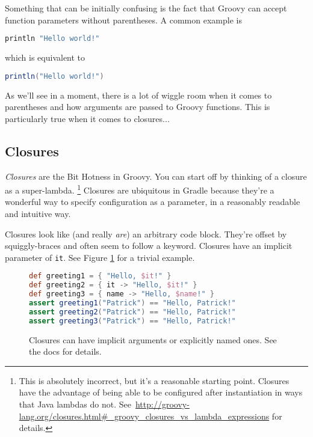 \documentclass[]{article}
\theoremstyle{definition}
\begin{document}
Something that can be initially confusing is the fact that Groovy can accept function parameters
  without parentheses.
A common example is 

\begin{lstlisting}[language=Groovy]
println "Hello world!"
\end{lstlisting}
which is equivalent to 
\begin{lstlisting}[language=Groovy]
println("Hello world!")
\end{lstlisting}

As we'll see in a moment, there is a lot of wiggle room when it comes to parentheses
  and how arguments are passed to Groovy functions.
This is particularly true when it comes to closures...

\subsection{Closures}
\textit{Closures} are the Bit Hotness in Groovy.
You can start off by thinking of a closure as a super-lambda.%
\footnote{This is absolutely incorrect, but it's a reasonable starting point.
  Closures have the advantage of being able to be configured after instantiation in ways that Java lambdas do not.
  See\ \url{http://groovy-lang.org/closures.html\#\_groovy_closures_vs_lambda_expressions} for details.}
Closures are ubiquitous in Gradle because they're a wonderful way to specify configuration as a parameter, in a reasonably readable and intuitive way.

Closures look like (and really \emph{are}) an arbitrary code block.
They're offset by squiggly-braces and often seem to follow a keyword.
Closures have an implicit parameter of \texttt{it}.
See Figure \ref{fig:equiv} for a trivial example.

\begin{figure}[h]
  \centering
  \begin{lstlisting}[language=Groovy]
def greeting1 = { "Hello, $it!" } 
def greeting2 = { it -> "Hello, $it!" }
def greeting3 = { name -> "Hello, $name!" }
assert greeting1("Patrick") == "Hello, Patrick!"
assert greeting2("Patrick") == "Hello, Patrick!"
assert greeting3("Patrick") == "Hello, Patrick!"
  \end{lstlisting}
\caption{Closures can have implicit arguments or explicitly named ones.  See the docs for details.} %
\label{fig:equiv}
\end{figure}
\end{document}
